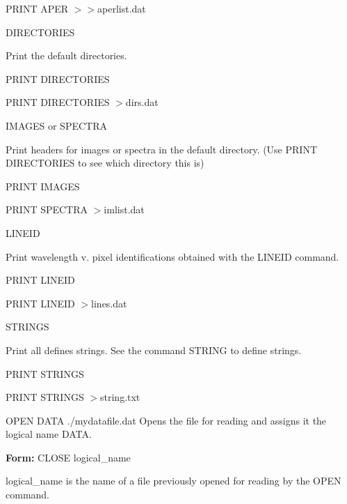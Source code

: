 {\begin{example}
{\begin{hanging}
    \item{PRINT APER $>>$aperlist.dat}
  \end{hanging}
}
\par\item[DIRECTORIES\hfill]{Print the default directories.
  \begin{hanging}
    \item{PRINT DIRECTORIES}
    \item{PRINT DIRECTORIES $>$dirs.dat}
  \end{hanging}
}
\par\item[IMAGES or SPECTRA\hfill]{Print headers for images or spectra in the
       default directory.  (Use PRINT DIRECTORIES to see which directory
       this is)
  \begin{hanging}
    \item{PRINT IMAGES}
    \item{PRINT SPECTRA $>$imlist.dat}
  \end{hanging}
}
\par\item[LINEID\hfill]{Print wavelength v. pixel identifications obtained
       with the LINEID command.
  \begin{hanging}
    \item{PRINT LINEID}
    \item{PRINT LINEID $>$lines.dat}
  \end{hanging}
}
\par\item[STRINGS\hfill]{Print all defines strings.  See the command STRING
       to define strings.
  \begin{hanging}
    \item{PRINT STRINGS}
    \item{PRINT STRINGS $>$string.txt}
  \end{hanging}
}
\end{example}%
\lthtmlfigureZ
\lthtmlcheckvsize\clearpage}

{\newpage\clearpage
{}%
\begin{example}
  \item[OPEN DATA ./mydatafile.dat\hfill]{ Opens the file for reading
       and assigns it the logical name DATA.}
\end{example}%
\lthtmlfigureZ
\lthtmlcheckvsize\clearpage}

{\newpage\clearpage
{}%
\begin{command}
  \item[\textbf{Form: }CLOSE logical\_name\hfill]{}
  \item[logical\_name]{is the name of a file previously
       opened for reading by the OPEN command.}
\end{command}%
\lthtmlfigureZ
\lthtmlcheckvsize\clearpage}

